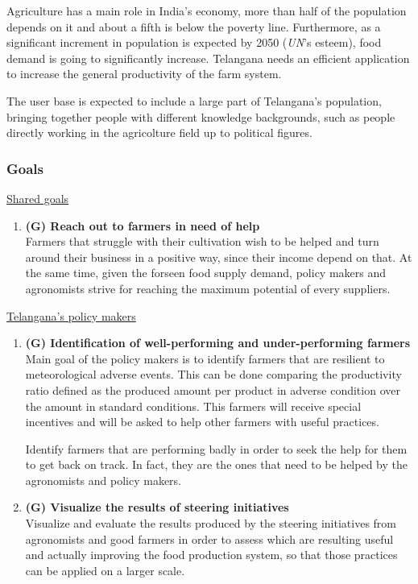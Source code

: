 \documentclass[table, 12pt]{article}
\begin{document}
Agriculture has a main role in India's economy, more than half of the population depends on it and about a fifth is below the poverty line.
Furthermore, as a significant increment in population is expected by 2050 (\emph{UN}'s esteem), food demand is going to significantly increase.
Telangana needs an efficient application to increase the general productivity of the farm system.

The user base is expected to include a large part of Telangana's population, bringing together people with different knowledge backgrounds, such as people directly working in the agricolture field up to political figures.

\subsubsection{Goals}
\underline{Shared goals}
\begin{enumerate}
    \item  \textbf{(G) Reach out to farmers in need of help} \\ Farmers that struggle with their cultivation wish to be helped and turn around their business in a positive way, since their income depend on that. At the same time, given the forseen food supply demand, policy makers and agronomists strive for reaching the maximum potential of every suppliers.
\end{enumerate}
\underline{Telangana's policy makers}
\begin{enumerate}
    \item \textbf{(G) Identification of well-performing  and under-performing farmers}\\
    Main goal of the policy makers is to identify farmers that are resilient to meteorological adverse events.
    This can be done comparing the productivity ratio defined as the produced amount per product in adverse condition over the amount in standard conditions.
    This farmers will receive special incentives and will be asked to help other farmers 
    with useful practices.

    Identify farmers that are performing badly in order to seek the help for them to get back on track. In fact, they are the ones that need to be helped by the agronomists and policy makers.
    \item \textbf{(G) Visualize the results of steering initiatives}\\
    Visualize and evaluate the results produced by the steering initiatives from agronomists and good farmers in order to assess which are resulting useful and actually improving the food production system, so that those practices can be applied on a larger scale.
\end{enumerate}
\end{document}
